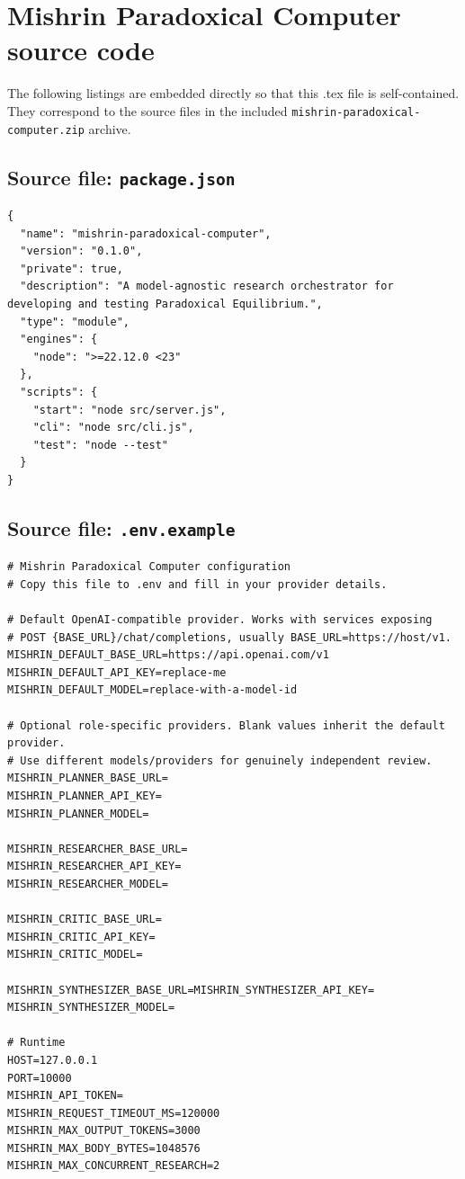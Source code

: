 \documentclass[10pt,a4paper]{article}
\begin{document}
\section{Mishrin Paradoxical Computer source code}
The following listings are embedded directly so that this .tex file is self-contained. They correspond to the source files in the included \texttt{mishrin-paradoxical-computer.zip} archive.
\subsection{Source file: \texttt{package.json}}
\begin{lstlisting}
{
  "name": "mishrin-paradoxical-computer",
  "version": "0.1.0",
  "private": true,
  "description": "A model-agnostic research orchestrator for developing and testing Paradoxical Equilibrium.",
  "type": "module",
  "engines": {
    "node": ">=22.12.0 <23"
  },
  "scripts": {
    "start": "node src/server.js",
    "cli": "node src/cli.js",
    "test": "node --test"
  }
}
\end{lstlisting}
\subsection{Source file: \texttt{.env.example}}
\begin{lstlisting}
# Mishrin Paradoxical Computer configuration
# Copy this file to .env and fill in your provider details.

# Default OpenAI-compatible provider. Works with services exposing
# POST {BASE_URL}/chat/completions, usually BASE_URL=https://host/v1.
MISHRIN_DEFAULT_BASE_URL=https://api.openai.com/v1
MISHRIN_DEFAULT_API_KEY=replace-me
MISHRIN_DEFAULT_MODEL=replace-with-a-model-id

# Optional role-specific providers. Blank values inherit the default provider.
# Use different models/providers for genuinely independent review.
MISHRIN_PLANNER_BASE_URL=
MISHRIN_PLANNER_API_KEY=
MISHRIN_PLANNER_MODEL=

MISHRIN_RESEARCHER_BASE_URL=
MISHRIN_RESEARCHER_API_KEY=
MISHRIN_RESEARCHER_MODEL=

MISHRIN_CRITIC_BASE_URL=
MISHRIN_CRITIC_API_KEY=
MISHRIN_CRITIC_MODEL=

MISHRIN_SYNTHESIZER_BASE_URL=MISHRIN_SYNTHESIZER_API_KEY=
MISHRIN_SYNTHESIZER_MODEL=

# Runtime
HOST=127.0.0.1
PORT=10000
MISHRIN_API_TOKEN=
MISHRIN_REQUEST_TIMEOUT_MS=120000
MISHRIN_MAX_OUTPUT_TOKENS=3000
MISHRIN_MAX_BODY_BYTES=1048576
MISHRIN_MAX_CONCURRENT_RESEARCH=2
\end{lstlisting}
\end{document}
